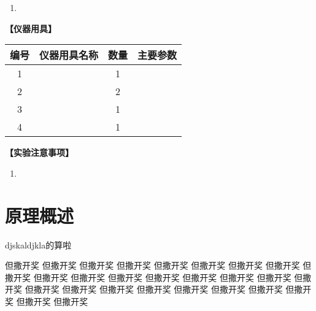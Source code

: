 \documentclass{ctexart}
\numberwithin{equation}{section}%
\theoremstyle{ansstyle}
\begin{document}
\begin{enumerate}
    \item %
\end{enumerate}
    

\large{\textbf{【仪器用具】}} %

\begin{center}
    \begin{tabular}{|c|c|c|p{8cm}|}%
        \hline
        编号 & 仪器用具名称 & 数量 & 主要参数 \\
        \hline
        1 &  & 1 &  \\ %
        \hline
        2 &  & 2 &  \\
        \hline
        3  &   & 1 &  \\
        \hline
        4  &   & 1 &  \\
        \hline
    \end{tabular}
\end{center}


\large{\textbf{【实验注意事项】}} %

\begin{enumerate}
    \item 
\end{enumerate}


\section{原理概述}
djskaldjkla的算啦\par
但撒开奖
但撒开奖
但撒开奖
但撒开奖
但撒开奖
但撒开奖
但撒开奖
但撒开奖
但撒开奖
但撒开奖
但撒开奖
但撒开奖
但撒开奖
但撒开奖
但撒开奖
但撒开奖
但撒开奖
但撒开奖
但撒开奖
但撒开奖
但撒开奖
但撒开奖
但撒开奖
但撒开奖
但撒开奖
但撒开奖
但撒开奖
% 
\end{document}
